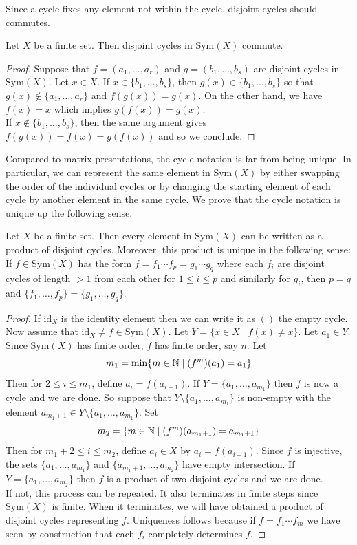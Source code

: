 \documentclass[a4paper]{article}
\begin{document}
Since a cycle fixes any element not within the cycle, disjoint cycles should commutes. 

\begin{prp}{}{} Let $X$ be a finite set. Then disjoint cycles in $\text{Sym}(X)$ commute. 
\begin{proof}
Suppose that $f=(a_1,\dots,a_r)$ and $g=(b_1,\dots,b_s)$ are disjoint cycles in $\text{Sym}(X)$. Let $x\in X$. If $x\in\{b_1,\dots,b_s\}$, then $g(x)\in\{b_1,\dots,b_s\}$ so that $g(x)\notin\{a_1,\dots,a_r\}$ and $f(g(x))=g(x)$. On the other hand, we have $f(x)=x$ which implies $g(f(x))=g(x)$. \\

If $x\notin\{b_1,\dots,b_s\}$, then the same argument gives $f(g(x))=f(x)=g(f(x))$ and so we conclude. 
\end{proof}
\end{prp}

Compared to matrix presentations, the cycle notation is far from being unique. In particular, we can represent the same element in $\text{Sym}(X)$ by either swapping the order of the individual cycles or by changing the starting element of each cycle by another element in the same cycle. We prove that the cycle notation is unique up the following sense. \\

\begin{thm}{}{} Let $X$ be a finite set. Then every element in $\text{Sym}(X)$ can be written as a product of disjoint cycles. Moreover, this product is unique in the following sense: If $f\in\text{Sym}(X)$ has the form $f=f_1\cdots f_p=g_1\cdots g_q$ where each $f_i$ are disjoint cycles of length $>1$ from each other for $1\leq i\leq p$ and similarly for $g_i$, then $p=q$ and $\{f_1,\dots,f_p\}=\{g_1,\dots,g_q\}$. 
\begin{proof}
If $\text{id}_X$ is the identity element then we can write it as $()$ the empty cycle. Now assume that $\text{id}_X\neq f\in\text{Sym}(X)$. Let $Y=\{x\in X\;|\;f(x)\neq x\}$. Let $a_1\in Y$. Since $\text{Sym}(X)$ has finite order, $f$ has finite order, say $n$. Let $$m_1=\min\{m\in\mathbb{N}\;|\;(f^m)(a_1)=a_1\}$$ Then for $2\leq i\leq m_1$, define $a_i=f(a_{i-1})$. If $Y=\{a_1,\dots,a_{m_1}\}$ then $f$ is now a cycle and we are done. So suppose that $Y\setminus\{a_1,\dots,a_{m_1}\}$ is non-empty with the element $a_{m_1+1}\in Y\setminus\{a_1,\dots,a_{m_1}\}$. Set $$m_2=\{m\in\mathbb{N}\;|\;(f^m)(a_{m_1+1})=a_{m_1+1}\}$$ Then for $m_1+2\leq i\leq m_2$, define $a_i\in X$ by $a_i=f(a_{i-1})$. Since $f$ is injective, the sets $\{a_1,\dots,a_{m_1}\}$ and $\{a_{m_1+1},\dots,a_{m_2}\}$ have empty intersection. If $Y=\{a_1,\dots,a_{m_2}\}$ then $f$ is a product of two disjoint cycles and we are done. \\

If not, this process can be repeated. It also terminates in finite steps since $\text{Sym}(X)$ is finite. When it terminates, we will have obtained a product of disjoint cycles representing $f$. Uniqueness follows because if $f=f_1\cdots f_m$ we have seen by construction that each $f_i$ completely determines $f$. 
\end{proof}
\end{thm}
\end{document}
